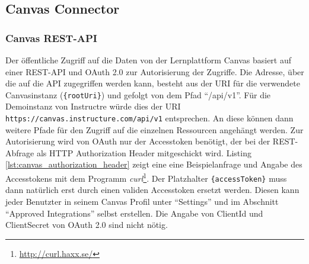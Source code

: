 

\subsection{Canvas Connector} %
\label{sub:canvas_connector}


\subsubsection{Canvas REST-API} %
\label{ssub:canvas_api}

Der öffentliche Zugriff auf die Daten von der Lernplattform Canvas basiert auf einer REST-API und OAuth 2.0 zur Autorisierung der Zugriffe. Die Adresse, über die auf die API zugegriffen werden kann, besteht aus der URI für die verwendete Canvasinstanz (\texttt{\{rootUri\}}) und gefolgt von dem Pfad \enquote{/api/v1}. Für die Demoinstanz von Instructre würde dies der URI \texttt{https://canvas.instructure.com/api/v1} entsprechen. An diese können dann weitere Pfade für den Zugriff auf die einzelnen Ressourcen angehängt werden. Zur Autorisierung wird von OAuth nur der Accesstoken benötigt, der bei der REST-Abfrage als HTTP Authorization Header mitgeschickt wird. Listing \ref{lst:canvas_authorization_header} zeigt eine eine Beispielanfrage und Angabe des Accesstokens mit dem Programm \emph{curl}\footnote{\url{http://curl.haxx.se/}}. Der Platzhalter \texttt{\{accessToken\}} muss dann natürlich erst durch einen validen Accesstoken ersetzt werden. Diesen kann jeder Benutzter in seinem Canvas Profil unter \enquote{Settings} und im Abschnitt \enquote{Approved Integrations} selbst erstellen. Die Angabe von ClientId und ClientSecret von OAuth 2.0 sind nicht nötig.

